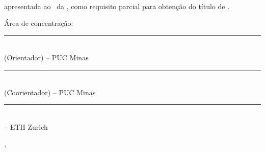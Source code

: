 
\makeatletter	%

	\thispagestyle{empty}
	
	\begin{center}
		\por %
	\end{center}
	
	\vfill %
	
	\begin{center}
		\textbf{\monog}\\ %
		\textbf{\subtitulo} %
	\end{center}
	
	\vfill %
	
	\begin{flushright}
		\begin{minipage}{9cm}
			{\tipo apresentada ao \curso~da \univ, 
			como requisito parcial para obtenção do 
			título  de \grau.} %
			
			\bigskip
			
			Área de concentração: {\areaConcentracao}
			
		\end{minipage}
	\end{flushright}
	
	\vfill %
	
	\begin{center}
		\rule{8cm}{0.01cm}\\ %
		\profOrientador (Orientador) -- PUC Minas %
	\end{center}
	
	\vfill %
	
	\begin{center}
		\rule{8cm}{0.01cm}\\  %
		\profA (Coorientador) -- PUC Minas  %
	\end{center}
	
	\vfill %
	
	\begin{center}
		\rule{8cm}{0.01cm}\\ %
		\profB -- ETH Zurich %
	\end{center}
	
	\vfill %
	
	\begin{center}
		\cidade, \dataCompleta %
	\end{center}
\makeatletter	%
	\newpage %
